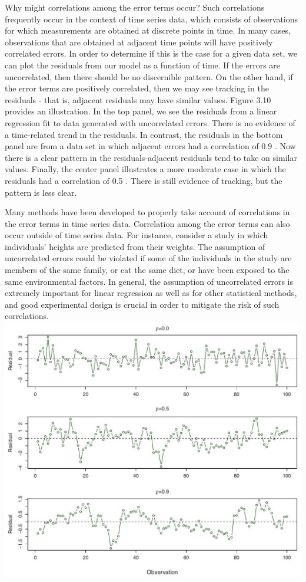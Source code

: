 \documentclass[10pt]{article}
\begin{document}
Why might correlations among the error terms occur? Such correlations frequently occur in the context of time series data, which consists of observations for which measurements are obtained at discrete points in time. In many cases, observations that are obtained at adjacent time points will have positively correlated errors. In order to determine if this is the case for a given data set, we can plot the residuals from our model as a function of time. If the errors are uncorrelated, then there should be no discernible pattern. On the other hand, if the error terms are positively correlated, then we may see tracking in the residuals - that is, adjacent residuals may have similar values. Figure 3.10 provides an illustration. In the top panel, we see the residuals from a linear regression fit to data generated with uncorrelated errors. There is no evidence of a time-related trend in the residuals. In contrast, the residuals in the bottom panel are from a data set in which adjacent errors had a correlation of 0.9 . Now there is a clear pattern in the residuals-adjacent residuals tend to take on similar values. Finally, the center panel illustrates a more moderate case in which the residuals had a correlation of 0.5 . There is still evidence of tracking, but the pattern is less clear.

Many methods have been developed to properly take account of correlations in the error terms in time series data. Correlation among the error terms can also occur outside of time series data. For instance, consider a study in which individuals' heights are predicted from their weights. The assumption of uncorrelated errors could be violated if some of the individuals in the study are members of the same family, or eat the same diet, or have been exposed to the same environmental factors. In general, the assumption of uncorrelated errors is extremely important for linear regression as well as for other statistical methods, and good experimental design is crucial in order to mitigate the risk of such correlations.\\
\includegraphics[max width=\textwidth, center]{2025_05_05_efe77898333945044de4g-110}
\end{document}
